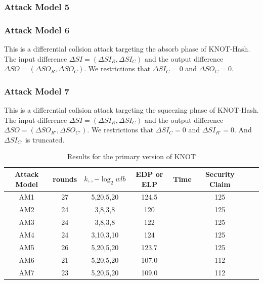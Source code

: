 \subsubsection{Attack Model 5}


\subsubsection{Attack Model 6}
This is a differential collsion attack targeting the absorb phase of KNOT-Hash. The input difference $\Delta SI=(\Delta SI_R,\Delta SI_C)$ and the output difference $\Delta SO=(\Delta SO_R,\Delta SO_C)$. We restrictions that $\Delta SI_C=0$ and $\Delta SO_C=0$. 

\subsubsection{Attack Model 7}
This is a differential collsion attack targeting the squeezing phase of KNOT-Hash. The input difference $\Delta SI=(\Delta SI_R,\Delta SI_C)$ and the output difference $\Delta SO=(\Delta SO_{R'},\Delta SO_{C'})$. We restrictions that $\Delta SI_C=0$ and $\Delta SI_{R'}=0$. And $\Delta SI_{C'}$ is truncated. 

\begin{table}
	\caption{Results for the primary version of KNOT}\label{tab:knot}
	\centering
	\begin{tabular}{|c|c|c|c|c|c|c|c|}
		\hline
		Attack Model & rounds & $k,,-\log_2wlb$ & EDP or ELP & Time & Security Claim\\
		\hline
		AM1 & 27 & 5,20,5,20 & 124.5 & & 125 \\
		AM2 & 24 & 3,8,3,8 & 120 & & 125 \\
		AM3 & 24 & 3,8,3,8 & 122 & & 125 \\
		AM4 & 24 & 3,10,3,10 & 124 & & 125 \\
		AM5 & 26 & 5,20,5,20 & 123.7 & & 125 \\
		AM6 & 21 & 5,20,5,20 & 107.0 & & 112 \\
		AM7 & 23 & 5,20,5,20 & 109.0 & & 112 \\
		\hline
	\end{tabular}
\end{table}